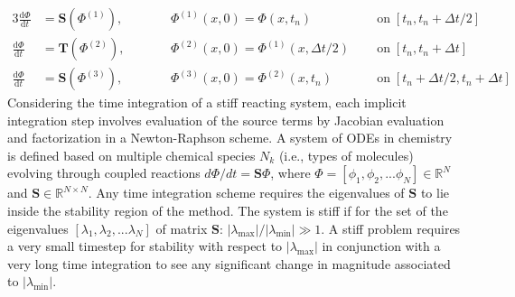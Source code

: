 \documentclass[letterpaper,twocolumn,10pt]{article}
\begin{document}
\footnotesize
\begin{alignat*}{3}
    \frac{\textrm{d} \Phi}{\textrm{d} t} &= \mathbf{S}(\Phi^{(1)}), \qquad &&\Phi^{(1)}(x,0) = \Phi(x,t_n) \;\; & &\textrm{on} \; [t_n, t_n + \Delta t / 2] \\
    \frac{\textrm{d} \Phi}{\textrm{d} t} &= \mathbf{T}(\Phi^{(2)}), \qquad &&\Phi^{(2)}(x,0) = \Phi^{(1)}(x,\Delta t / 2) \;\; & &\textrm{on} \; [t_n, t_n + \Delta t] \\
    \frac{\textrm{d} \Phi}{\textrm{d} t} &= \mathbf{S}(\Phi^{(3)}), \qquad &&\Phi^{(3)}(x,0) = \Phi^{(2)}(x,t_n) \;\; & &\textrm{on} \; [t_n + \Delta t / 2, t_n + \Delta t]
\end{alignat*}
\normalsize
Considering the time integration of a stiff reacting system, each implicit integration step involves evaluation of the source terms by Jacobian evaluation and factorization in a Newton-Raphson scheme. A system of ODEs in chemistry is defined based on multiple chemical species $N_k$ (i.e., types of molecules) evolving through coupled reactions $d \Phi / d t = \mathbf{S} \Phi$, where $\Phi = [\phi_1, \phi_2, ... \phi_N] \in \mathbb{R}^N$ and $\mathbf{S} \in \mathbb{R}^{N \times N}$. Any time integration scheme requires the eigenvalues of $\mathbf{S}$ to lie inside the stability region of the method. The system is stiff if for the set of the eigenvalues $[\lambda_1, \lambda_2, ... \lambda_N]$ of matrix $\mathbf{S}$: $|\lambda_\textrm{max}|/|\lambda_\textrm{min}| \gg 1$. A stiff problem requires a very small timestep for stability with respect to $|\lambda_\textrm{max}|$ in conjunction with a very long time integration to see any significant change in magnitude associated to $|\lambda_\textrm{min}|$.
\end{document}
